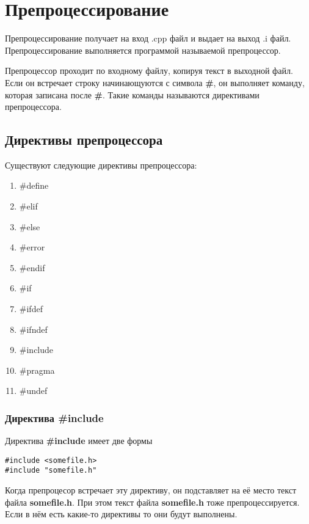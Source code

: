 \section{Препроцессирование}

Препроцессирование получает на вход .cpp файл и выдает на выход .i файл. Препроцессирование выполняется программой называемой препроцессор.

Препроцессор проходит по входному файлу, копируя текст в выходной файл. Если он встречает строку начинающуются с символа {\bf \#}, он выполняет команду, которая записана после {\bf \#}. Такие команды называются директивами препроцессора.

\subsection{Директивы препроцессора}

Существуют следующие директивы препроцессора:
\begin{enumerate}
\item \#define
\item \#elif
\item \#else
\item \#error
\item \#endif
\item \#if
\item \#ifdef
\item \#ifndef
\item \#include
\item \#pragma
\item \#undef
\end{enumerate}

\subsubsection{Директива \#include}

Директива {\bf \#include} имеет две формы
\begin{verbatim}
#include <somefile.h>
#include "somefile.h"
\end{verbatim}

Когда препроцесор встречает эту директиву, он подставляет на её место текст файла {\bf somefile.h}. При этом текст файла {\bf somefile.h} тоже препроцессируется. Если в нём есть какие-то директивы то они будут выполнены.

